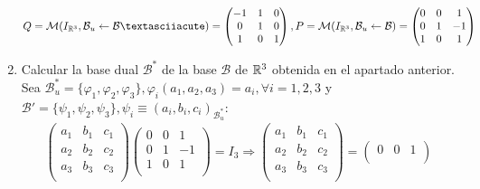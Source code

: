 \documentclass[12pt]{article}
\begin{document}
\begin{ejercicio}[4 puntos]
\begin{enumerate}[label=\alph*.]
        \begin{equation*}
            Q = \mathcal{M}(I_{\R^3}, \mathcal{B}_u \leftarrow \mathcal{B´}) = \begin{pmatrix}
                -1 & 1 & 0 \\
                0 & 1 & 0 \\
                1 & 0 & 1 \\
            \end{pmatrix},
             P = \mathcal{M}(I_{\R^3}, \mathcal{B}_u \leftarrow \mathcal{B}) = \begin{pmatrix}
                0 & 0 & 1 \\
                0 & 1 & -1 \\
                1 & 0 & 1 \\
            \end{pmatrix}
        \end{equation*}
        \item Calcular la base dual $\mathcal{B}^*$ de la base $\mathcal{B}$ de ${\mathbb{R}}^3$ obtenida en el apartado anterior.
        \noindent
        Sea $\mathcal{B}_u^* = \{\varphi_1, \varphi_2, \varphi_3\}, \varphi_i(a_1, a_2, a_3) = a_i, \forall i = 1, 2, 3$  y $\mathcal{B'} = \{\psi_1, \psi_2, \psi_3\}, \psi_i\equiv(a_i, b_i, c_i)_{\mathcal{B}_u^*}$:
        \begin{gather*}
            \begin{pmatrix}
                a_1 & b_1 & c_1 \\
                a_2 & b_2 & c_2 \\
                a_3 & b_3 & c_3 \\
            \end{pmatrix} 
            \begin{pmatrix}
                0 & 0 & 1 \\
                0 & 1 & -1 \\
                1 & 0 & 1 \\
            \end{pmatrix} = I_3 \Rightarrow 
             \begin{pmatrix}
                a_1 & b_1 & c_1 \\
                a_2 & b_2 & c_2 \\
                a_3 & b_3 & c_3 \\
            \end{pmatrix} =
            \begin{pmatrix}
                0 & 0 & 1 \\

\end{pmatrix}
\end{gather*}
\end{enumerate}
\end{ejercicio}
\end{document}
